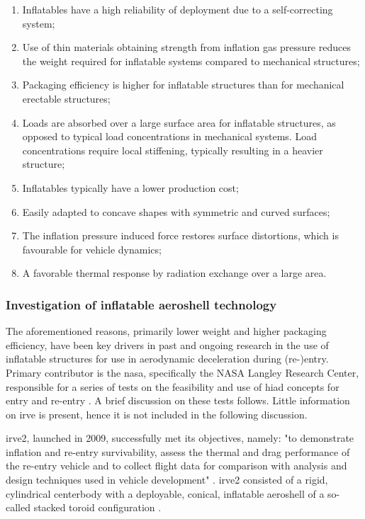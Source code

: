 \begin{enumerate}
\item Inflatables have a high reliability of deployment due to a self-correcting system;
\item Use of thin materials obtaining strength from inflation gas pressure reduces the weight required for inflatable systems compared to mechanical structures;
\item Packaging efficiency is higher for inflatable structures than for mechanical erectable structures;
\item Loads are absorbed over a large surface area for inflatable structures, as opposed to typical load concentrations in mechanical systems. Load concentrations require local stiffening, typically resulting in a heavier structure;
\item Inflatables typically have a lower production cost;
\item Easily adapted to concave shapes with symmetric and curved surfaces;
\item The inflation pressure induced force restores surface distortions, which is favourable for vehicle dynamics;
\item A favorable thermal response by radiation exchange over a large area.
\end{enumerate}

\subsubsection{Investigation of inflatable aeroshell technology}
The aforementioned reasons, primarily lower weight and higher packaging efficiency, have been key drivers in past and ongoing research in the use of inflatable structures for use in aerodynamic deceleration during (re-)entry. Primary contributor is the \gls{nasa}, specifically the NASA Langley Research Center, responsible for a series of tests on the feasibility and use of \gls{hiad} concepts for entry and re-entry \cite{Hughes2005, Dillman2010, Dillman2012, Dillman2014}. A brief discussion on these tests follows. Little information on \gls{irve} \cite{Hughes2005} is present, hence it is not included in the following discussion.  

\gls{irve2}, launched in 2009, successfully met its objectives, namely: "to demonstrate inflation and re-entry survivability, assess the thermal and drag performance of the re-entry vehicle and to collect flight data for comparison with analysis and design techniques used in vehicle development" \cite[p.1]{Dillman2010}. \gls{irve2} consisted of a rigid, cylindrical centerbody with a deployable, conical, inflatable aeroshell of a so-called stacked toroid configuration \cite{Smith2010,Bose2009}.

